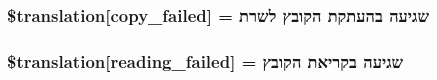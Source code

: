 \subsubsection[{\$translation}]{\setlength{\rightskip}{0pt plus 5cm}\$translation\mbox{[}\textquotesingle{}copy\+\_\+failed\textquotesingle{}\mbox{]} = \textquotesingle{}שגיעה בהעתקת הקובץ לשרת\textquotesingle{}}\label{class_8upload_8he___i_l_8php_a783c9358bcf54a054545b50098bc679b}
\hypertarget{class_8upload_8he___i_l_8php_a01bea14c9fd5f353f62db44beabfcd42}{}
\subsubsection[{\$translation}]{\setlength{\rightskip}{0pt plus 5cm}\$translation\mbox{[}\textquotesingle{}reading\+\_\+failed\textquotesingle{}\mbox{]} = \textquotesingle{}שגיעה בקריאת הקובץ\textquotesingle{}}\label{class_8upload_8he___i_l_8php_a01bea14c9fd5f353f62db44beabfcd42}
